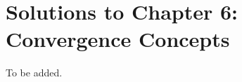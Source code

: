 \section{Solutions to Chapter 6: Convergence Concepts}
\label{sec:solutions-chapter-6}

\setcounter{Lcount}{0}
\begin{list}{6.7.}{}
\item To be added.
\end{list}

\clearpage{}

